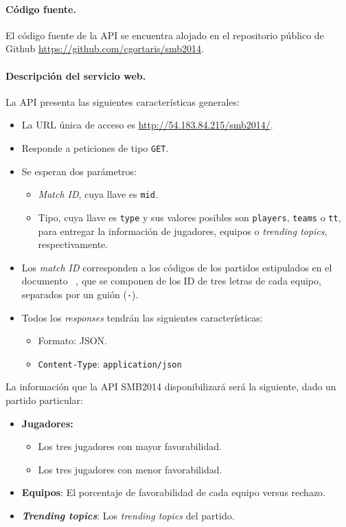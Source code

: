 \documentclass[11pt,spanish]{article}
\begin{document}
\paragraph{Código fuente.}
El código fuente de la API se encuentra alojado en el repositorio público de Github \url{https://github.com/cgortaris/smb2014}.

\paragraph{Descripción del servicio web.}
La API presenta las siguientes características generales:
\begin{itemize}
    \item La URL única de acceso es \url{http://54.183.84.215/smb2014/}.
    \item Responde  a peticiones de tipo \texttt{GET}.
    \item Se esperan dos parámetros:
    \begin{itemize}
        \item \emph{Match ID}, cuya llave es \texttt{mid}.
        \item Tipo, cuya llave es \texttt{type} y sus valores posibles son \texttt{players}, \texttt{teams} o \texttt{tt}, para entregar la información de jugadores, equipos o \emph{trending topics}, respectivamente.
    \end{itemize}
    \item Los \emph{match ID} corresponden a los códigos de los partidos estipulados en el documento ~\cite{fifa}, que se componen de los ID de tres letras de cada equipo, separados por un guión (\texttt{-}).
    \item Todos los \emph{responses} tendrán las siguientes características:
    \begin{itemize}
        \item Formato: JSON.
        \item \texttt{Content-Type}: \texttt{application/json}
    \end{itemize}
\end{itemize}

La información que la API SMB2014 disponibilizará será la siguiente, dado un partido particular:
\begin{itemize}
\item \textbf{Jugadores:} 
    \begin{itemize}
    \item Los tres jugadores con mayor favorabilidad.
    \item Los tres jugadores con menor favorabilidad.   
    \end{itemize}
\item \textbf{Equipos}: El porcentaje de favorabilidad de cada equipo versus rechazo.
\item \textbf{\emph{Trending topics}}: Los \emph{trending topics} del partido.
\end{itemize}
\end{document}
